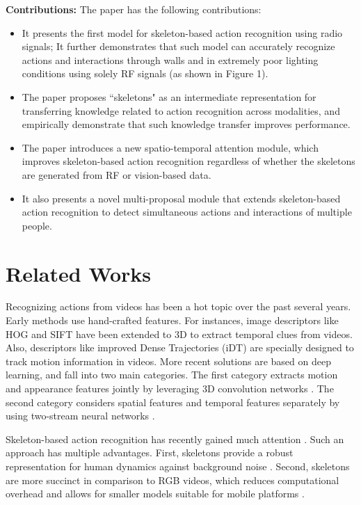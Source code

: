 \documentclass[10pt,twocolumn,letterpaper]{article}
\newenvironment{Itemize}{\begin{itemize}\setlength{\itemsep}{0pt}\setlength{\topsep}{0pt}\setlength{\partopsep}{0pt}\setlength{\parskip}{0pt}}{\end{itemize}}
\begin{document}
\vskip 0.06in \noindent
{\bf Contributions:} 
The paper has the following contributions:

\begin{Itemize}
\item 
It presents the first model for skeleton-based action recognition using radio signals; It further demonstrates that such model can accurately recognize actions and interactions through walls and in extremely poor lighting conditions using solely RF signals (as shown in Figure 1).
\item
The paper proposes ``skeletons" as an intermediate representation for transferring knowledge related to action recognition across modalities, and empirically demonstrate that such knowledge transfer improves performance. 
\item
The paper introduces a new spatio-temporal attention module, which improves skeleton-based action recognition regardless of whether the skeletons are generated from RF or vision-based data.
\item
It also presents a novel multi-proposal module that extends skeleton-based action recognition to detect simultaneous actions and interactions of multiple people.
\end{Itemize}
%
 \section{Related Works}
\label{sec:related}

Recognizing actions from videos has been a hot topic over the past several years. Early methods use hand-crafted features. For instances, image descriptors like HOG and SIFT have been extended to 3D \cite{chen2009mosift,ng2018actionflownet} to extract temporal clues from videos. Also, descriptors like improved Dense Trajectories (iDT) \cite{wang2013action} are specially designed to track motion information in videos. More recent solutions are based on deep learning, and fall into two main categories. The first category extracts motion and appearance features jointly by leveraging 3D convolution networks \cite{carreira2017quo,qiu2017learning}. The second category considers spatial features and temporal features separately by using two-stream neural networks \cite{simonyan2014two, wang2016temporal}. 
 
\vskip  0.06in
Skeleton-based action recognition has recently gained much attention \cite{fang2017rmpe,cao2018openpose}. Such an approach has multiple advantages. First, skeletons  provide a robust representation for human dynamics against background noise \cite{li2018co}. Second, skeletons are more succinct in comparison to RGB videos, which reduces computational overhead and allows for smaller models suitable for mobile platforms \cite{ke2017new}.
\end{document}
